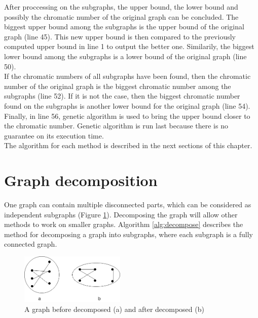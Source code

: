\documentclass[a4paper]{report}
\begin{document}
	After proccessing on the subgraphs, the upper bound, the lower bound and possibly the chromatic number of the original graph can be concluded. The biggest upper bound among the subgraphs is the upper bound of the original graph (line 45). This new upper bound is then compared to the previously computed upper bound in line 1 to output the better one. Similarily, the biggest lower bound among the subgraphs is a lower bound of the original graph (line 50). \\
	If the chromatic numbers of all subgraphs have been found, then the chromatic number of the original graph is the biggest chromatic number among the subgraphs (line 52). If it is not the case, then the biggest chromatic number found on the subgraphs is another lower bound for the original graph (line 54).\\
	Finally, in line 56, genetic algorithm is used to bring the upper bound closer to the chromatic number. Genetic algorithm is run last because there is no guarantee on its execution time.\\
	The algorithm for each method is described in the next sections of this chapter.
	

		\section{Graph decomposition}
		One graph can contain multiple disconnected parts, which can be considered as independent subgraphs (Figure \ref{fig:decompose}). Decomposing the graph will allow other methods to work on smaller graphs. Algorithm \ref{alg:decompose} describes the method for decomposing a graph into subgraphs, where each subgraph is a fully connected graph.\\
		
		\begin{figure}[h]
			\centering
			\includegraphics[width=50mm,scale=0.5]{figures/DecomposedGraph.png}
			\caption{A graph before decomposed (a) and after decomposed (b)}
			\label{fig:decompose}
		\end{figure}
	
\end{document}
